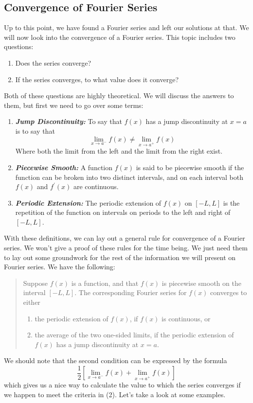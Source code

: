 \documentclass{article}
\begin{document}
\subsection{Convergence of Fourier Series}
\indent Up to this point, we have found a Fourier series and left our solutions at that. We will now look into the convergence of a Fourier series. This topic includes two questions:
\begin{enumerate}
\item Does the series converge?
\item If the series converges, to what value does it converge?
\end{enumerate}
\noindent Both of these questions are highly theoretical. We will discuss the answers to them, but first we need to go over some terms:
\begin{enumerate}
\item \textit{\textbf{Jump Discontinuity:}} To say that $f(x)$ has a jump discontinuity at $x = a$ is to say that
\[
\lim_{x \to a^{-}}f(x) \neq \lim_{x \to a^{+}}f(x)
\]
Where both the limit from the left and the limit from the right exist.
\item \textit{\textbf{Piecewise Smooth:}} A function $f(x)$ is said to be piecewise smooth if the function can be broken into two distinct intervals, and on each interval both $f(x)$ and $f^{'}(x)$ are continuous.
\item \textit{\textbf{Periodic Extension:}} The periodic extension of $f(x)$ on $[-L,L]$ is the repetition of the function on intervals on periods to the left and right of $[-L,L]$.
\end{enumerate}
\indent With these definitions, we can lay out a general rule for convergence of a Fourier series. We won't give a proof of these rules for the time being. We just need them to lay out some groundwork for the rest of the information we will present on Fourier series. We have the following:
\begin{quote}
Suppose $f(x)$ is a function, and that $f(x)$ is piecewise smooth on the interval $[-L,L]$. The corresponding Fourier series for $f(x)$ converges to either
\begin{enumerate}
\item the periodic extension of $f(x)$, if $f(x)$ is continuous, or
\item the average of the two one-sided limits, if the periodic extension of $f(x)$ has a jump discontinuity at $x = a$.
\end{enumerate}
\end{quote}
\noindent We should note that the second condition can be expressed by the formula
\[\frac{1}{2}\left[\lim_{x \to a^{-}}f(x) + \lim_{x \to a^{+}}f(x)\right]\]
which gives us a nice way to calculate the value to which the series converges if we happen to meet the criteria in (2). Let's take a look at some examples.\\\\
\end{document}
